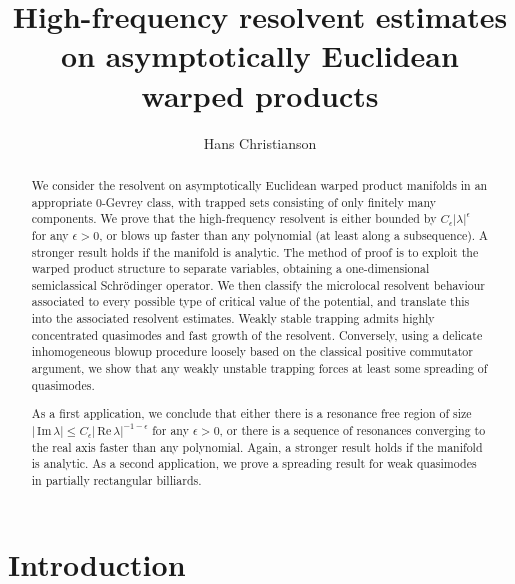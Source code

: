 \documentclass[twoside, final]{amsart}
\theoremstyle{definition}
\numberwithin{equation}{section}
\begin{document}
\title[Resolvent estimates]{High-frequency resolvent estimates on
  asymptotically Euclidean warped products}

\author[H. Christianson]{Hans Christianson}

\address{Department of Mathematics, UNC-Chapel Hill \\ CB\#3250
  Phillips Hall \\ Chapel Hill, NC 27599}

\keywords{}

\begin{abstract}
We consider the resolvent on asymptotically Euclidean warped product manifolds
in an appropriate 0-Gevrey class, with trapped sets consisting of only
finitely many components.  We prove that the high-frequency resolvent
is either bounded by $C_\epsilon |\lambda|^\epsilon$ for any $\epsilon>0$, or blows
up faster than any polynomial (at least along a subsequence).  A
stronger result holds if the manifold is analytic.  The
method of proof is to exploit the warped product structure to separate
variables, obtaining a one-dimensional semiclassical Schr\"odinger operator.  We
then classify the microlocal resolvent behaviour associated to every possible type of critical
value of the potential, and translate this into the associated
resolvent estimates.  Weakly stable trapping admits highly
concentrated quasimodes and fast growth of the resolvent.  Conversely,
using a
delicate inhomogeneous blowup procedure loosely based on the classical
positive commutator argument, we show that any weakly
unstable trapping forces at least some spreading of quasimodes.

As a first application, we conclude that either there is a resonance free region of size $|
{\,\mathrm{Im}\,} \lambda | {\leqslant} C_\epsilon | {\,\mathrm{Re}\,} \lambda |^{-1-\epsilon}$ for any
$\epsilon>0$, or there is a sequence of resonances converging to the
real axis faster than any polynomial.  Again, a stronger result holds
if the manifold is analytic.  As a second application, we
prove a spreading result for weak quasimodes in partially rectangular billiards.

\end{abstract}

\maketitle

\section{Introduction}
\label{S:intro}
\end{document}
